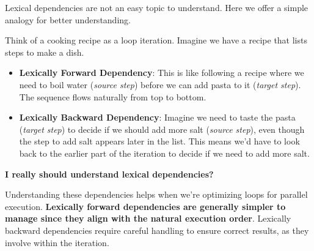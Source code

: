 \begin{examplebox}
    Lexical dependencies are not an easy topic to understand. Here we offer a simple analogy for better understanding.

    \highspace
    Think of a cooking recipe as a loop iteration. Imagine we have a recipe that lists steps to make a dish. 
    \begin{itemize}
        \item \textbf{Lexically Forward Dependency}: This is like following a recipe where we need to boil water (\emph{source step}) before we can add pasta to it (\emph{target step}). The sequence flows naturally from top to bottom.
        
        \item \textbf{Lexically Backward Dependency}: Imagine we need to taste the pasta (\emph{target step}) to decide if we should add more salt (\emph{source step}), even though the step to add salt appears later in the list. This means we'd have to look back to the earlier part of the iteration to decide if we need to add more salt.
    \end{itemize}
\end{examplebox}

\highspace
\begin{flushleft}
    \textcolor{Green3}{ \textbf{I really should understand lexical dependencies?}}
\end{flushleft}
Understanding these dependencies helps when we're optimizing loops for parallel execution. \textbf{Lexically forward dependencies are generally simpler to manage since they align with the natural execution order}. Lexically backward dependencies require careful handling to ensure correct results, as they involve  within the iteration.

\newpage

